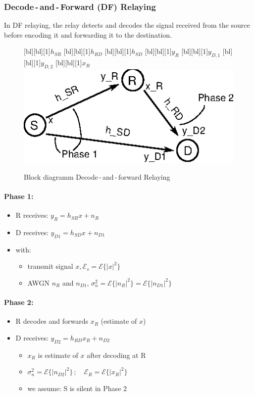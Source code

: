 \documentclass[a4paper, 10pt]{article}
\begin{document}
\subsubsection{Decode\,-\,and\,-\,Forward (DF) Relaying}
In DF relaying, the relay detects and decodes the signal received from the source before encoding it and  forwarding it to the destination.
	\begin{figure}[ht]
		\centering
		[bl][bl][1]{$h_{SR}$}
		[bl][bl][1]{$h_{RD}$}
		[bl][bl][1]{$h_{SD}$}
		[bl][bl][1]{$y_R$}
		[bl][bl][1]{$y_{D,1}$}
		[bl][bl][1]{$y_{D,2}$}
		[bl][bl][1]{$x_R$}		
		\includegraphics[scale=1.5]{DF_Relaying}	
		\caption{Block diagramm Decode\,-\,and\,-\,forward Relaying}
		\label{fig:df_relaying}
	\end{figure}
\paragraph{Phase 1:}
\begin{itemize}
	\item R receives: $ y_R = h_{SR}x + n_R $
	\item D receives: $ y_{D1} = h_{SD}x + n_{D1} $
	\item with: 
	\begin{itemize}
		\item transmit signal $x, \mathcal{E}_s = \mathcal{E}\{|x|^2\} $
		\item AWGN $n_R $ and $ n_{D1}$, $\sigma_n^2 = \mathcal{E}\{|n_R|^2\} = \mathcal{E}\{|n_{D1}|^2\} $
	\end{itemize}
\end{itemize}
\paragraph{Phase 2:}
\begin{itemize}
	\item R decodes and forwards $x_R$ (estimate of $x$)
	\item D receives: $ y_{D2} = h_{RD}x_R + n_{D2} $
	\begin{itemize}
		\item $x_R$ is estimate of $x $ after decoding at R
		\item $\sigma_n^2 = \mathcal{E}\{|n_{D2}|^2\}\,;\quad \mathcal{E}_R = \mathcal{E}\{|x_R|^2\} $
		\item we assume: S is silent in Phase 2		 
	\end{itemize}
\end{itemize}
\end{document}
